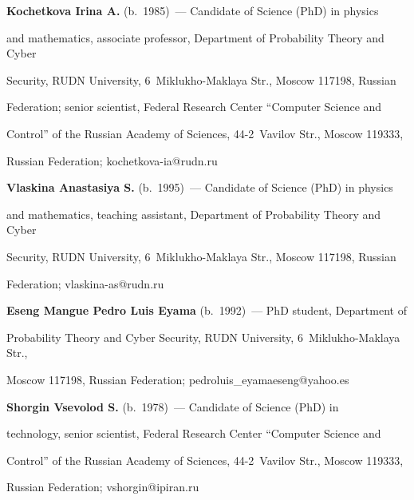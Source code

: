 \noindent


\textbf{Kochetkova Irina A.} (b.\ 1985)~--- Candidate of Science (PhD) in physics 


and mathematics, associate professor, Department of Probability Theory and Cyber 


Security, RUDN University, 6~Miklukho-Maklaya Str., Moscow 117198, Russian 


Federation; senior scientist, Federal Research Center ``Computer Science and 


Control'' of the Russian Academy of Sciences, 44-2~Vavilov Str., Moscow 119333, 


Russian Federation; \mbox{kochetkova-ia@rudn.ru}





\vspace*{3pt}





\noindent


\textbf{Vlaskina Anastasiya S.} (b.\ 1995)~--- Candidate of Science (PhD) in physics 


and mathematics, teaching assistant, Department of Probability Theory and Cyber 


Security, RUDN University, 6~Miklukho-Maklaya Str., Moscow 117198, Russian 


Federation; \mbox{vlaskina-as@rudn.ru}





\vspace*{3pt}





\noindent


\textbf{Eseng Mangue Pedro Luis Eyama} (b.\ 1992)~--- PhD student, Department of 


Probability Theory and Cyber Security, RUDN University, 6~Miklukho-Maklaya Str., 


Moscow 117198, Russian Federation; \mbox{pedroluis\_eyamaeseng@yahoo.es}





\vspace*{3pt}





\noindent


\textbf{Shorgin Vsevolod S.} (b.\ 1978)~--- Candidate of Science (PhD) in 


technology, senior scientist, Federal Research Center ``Computer Science and 


Control'' of the Russian Academy of Sciences, 44-2~Vavilov Str., Moscow 119333, 


Russian Federation; \mbox{vshorgin@ipiran.ru}











  


\label{end\stat}





\renewcommand{\bibname}{\protect\rm Литература} 


